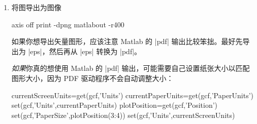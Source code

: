 {{\begin{enumerate}
\begin{codeexample}
h = datacursormode(gcf);
set(h,'UpdateFcn',@myupdatefcn,'SnapToDataVertex','off');
datacursormode on


function [txt] = myupdatefcn(obj,event_obj)

dpi = get(0,'ScreenPixelsPerInch');

screen_location=get(0,'PointerLocation');

figurePos = get(gcf,'Position');

pos = get(event_obj,'Position');

display(['(',num2str(pos(1)),',',num2str(pos(2)),',',num2str(pos(3)),') => (', ...
   num2str((screen_location(1)-figurePos(1))*72.27/dpi),',', ...
   num2str((screen_location(2)-figurePos(2))*72.27/dpi),')'])

txt = {['X: ',num2str(pos(1))],['Y: ',num2str(pos(2))],['Z: ',num2str(pos(3))]};
\end{codeexample}
        运行 |pgfplotscsconversion|，在你的图上点击四个点。最好选择靠近图边缘的非共线点。复制并粘贴写入 Matlab 命令窗口的四行内容。

        确保前两个点在屏幕上具有不同的 $X$ 和 $Y$ 值（即图像画布坐标）。
    \item 将图导出为图像
\begin{codeexample}
axis off
print -dpng matlabout -r400 %
\end{codeexample}

        如果你想导出矢量图形，应该注意 Matlab 的 |pdf| 输出比较笨拙。最好先导出为 |eps|，然后再从 |eps| 转换为 |pdf|。

        \emph{如果}你真的想使用 Matlab 的 |pdf| 输出，可能需要自己设置纸张大小以匹配图形大小，因为 PDF 驱动程序不会自动调整大小：
\begin{codeexample}
currentScreenUnits=get(gcf,'Units')     %
currentPaperUnits=get(gcf,'PaperUnits') %
set(gcf,'Units',currentPaperUnits)      %
plotPosition=get(gcf,'Position')        %
set(gcf,'PaperSize',plotPosition(3:4))  %
set(gcf,'Units',currentScreenUnits)     %


\end{codeexample}
\end{enumerate}}}
